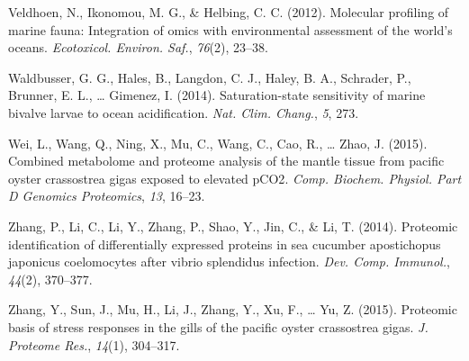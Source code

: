 \documentclass [11pt, proquest] {uwthesis}[2015/03/03]
\newlength{\cslhangindent}
\newenvironment{CSLReferences}%
{\setlength{\parindent}{0pt}%
\everypar{\setlength{\hangindent}{\cslhangindent}}\ignorespaces}%
{\par}
\begin{document}
\begin{CSLReferences}{1}{0}
\leavevmode\hypertarget{ref-Veldhoen2012}{}%
Veldhoen, N., Ikonomou, M. G., \& Helbing, C. C. (2012). Molecular profiling of marine fauna: Integration of omics with environmental assessment of the world's oceans. \emph{Ecotoxicol. Environ. Saf.}, \emph{76}(2), 23--38.

\leavevmode\hypertarget{ref-Waldbusser2014}{}%
Waldbusser, G. G., Hales, B., Langdon, C. J., Haley, B. A., Schrader, P., Brunner, E. L., \ldots{} Gimenez, I. (2014). Saturation-state sensitivity of marine bivalve larvae to ocean acidification. \emph{Nat. Clim. Chang.}, \emph{5}, 273.

\leavevmode\hypertarget{ref-Wei2015}{}%
Wei, L., Wang, Q., Ning, X., Mu, C., Wang, C., Cao, R., \ldots{} Zhao, J. (2015). Combined metabolome and proteome analysis of the mantle tissue from pacific oyster crassostrea gigas exposed to elevated {pCO2}. \emph{Comp. Biochem. Physiol. Part D Genomics Proteomics}, \emph{13}, 16--23.

\leavevmode\hypertarget{ref-Zhang2014}{}%
Zhang, P., Li, C., Li, Y., Zhang, P., Shao, Y., Jin, C., \& Li, T. (2014). Proteomic identification of differentially expressed proteins in sea cucumber apostichopus japonicus coelomocytes after vibrio splendidus infection. \emph{Dev. Comp. Immunol.}, \emph{44}(2), 370--377.

\leavevmode\hypertarget{ref-Zhang2015}{}%
Zhang, Y., Sun, J., Mu, H., Li, J., Zhang, Y., Xu, F., \ldots{} Yu, Z. (2015). Proteomic basis of stress responses in the gills of the pacific oyster crassostrea gigas. \emph{J. Proteome Res.}, \emph{14}(1), 304--317.

\end{CSLReferences}
\end{document}
